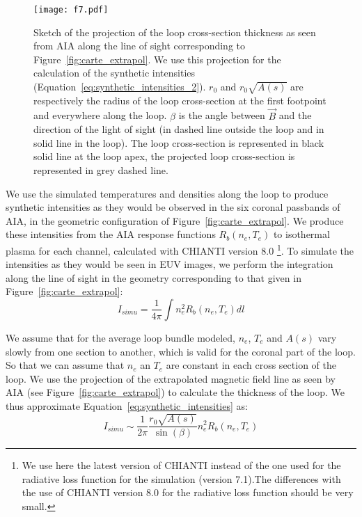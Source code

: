 \documentclass[preprint2]{aastex6}
\begin{document}
	\begin{figure}  
		\centering
                 \texttt{[image: f7.pdf]}
                 \caption{Sketch of the projection of the loop cross-section thickness as seen from AIA along the line of sight corresponding to Figure~\ref{fig:carte_extrapol}. We use this projection for the calculation of the synthetic intensities (Equation~\ref{eq:synthetic_intensities_2}). $r_0$ and  $r_0 \sqrt{A(s)}$ are respectively the radius of the loop cross-section at the first footpoint and everywhere along the loop. $\beta$ is the angle between $\vec B$ and the direction of the light of sight (in dashed line outside the loop and in solid line in the loop). The loop cross-section is represented in black solid line at the loop apex, the projected loop cross-section is represented in grey dashed line.}
                 \label{fig:sketch_int}
	\end{figure}
		

We use the simulated temperatures and densities along the loop to produce synthetic intensities as they would be observed in the six coronal passbands of AIA, in the geometric configuration of Figure~\ref{fig:carte_extrapol}.
We produce these intensities from the AIA response functions $R_b(n_e,T_e)$ to isothermal plasma for each channel, calculated with CHIANTI version 8.0 \citep{delzanna2015} \footnote{We use here the latest version of CHIANTI instead of the one used for the radiative loss function for the simulation (version 7.1).The differences with the use of CHIANTI version 8.0 for the radiative loss function should be very small.}. 
To simulate the intensities as they would be seen in EUV images, we perform the integration along the line of sight in the geometry corresponding to that given in Figure~\ref{fig:carte_extrapol}:
\begin{equation}
I_{simu} = \frac{1}{4\pi} \int n_e^2 R_b(n_e,T_e) dl
\label{eq:synthetic_intensities}
\end{equation}

We assume that for the average loop bundle modeled, $n_e$, $T_e$ and $A(s)$ vary slowly from one section to another, which is valid for the coronal part of the loop. So that we can assume that $n_e$ an $T_e$ are constant in each cross section of the loop.
We use the projection of the extrapolated magnetic field line as seen by AIA (see Figure~\ref{fig:carte_extrapol}) to calculate the thickness of the loop. 
We thus approximate Equation~\ref{eq:synthetic_intensities} as:
\begin{equation}
I_{simu} \sim \frac{1}{2\pi} \frac{r_0 \sqrt{A(s)}}{\sin(\beta)} n_e^2 R_b(n_e,T_e) 
\label{eq:synthetic_intensities_2}
\end{equation}
\end{document}
